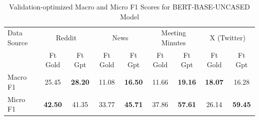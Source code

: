 \begin{table}[htbp]
\centering
\begin{tabular}{l *{8}{c}}
\toprule
Data Source & \multicolumn{2}{c}{Reddit} & \multicolumn{2}{c}{News} & \multicolumn{2}{c}{Meeting Minutes} & \multicolumn{2}{c}{X (Twitter)} \\
& Ft Gold & Ft Gpt & Ft Gold & Ft Gpt & Ft Gold & Ft Gpt & Ft Gold & Ft Gpt \\
\midrule
Macro F1 & 25.45 & \textbf{28.20} & 11.08 & \textbf{16.50} & 11.66 & \textbf{19.16} & \textbf{18.07} & 16.28 \\
Micro F1 & \textbf{42.50} & 41.35 & 33.77 & \textbf{45.71} & 37.86 & \textbf{57.61} & 26.14 & \textbf{59.45} \\
\bottomrule
\end{tabular}
\centering\caption{Validation-optimized Macro and Micro F1 Scores for BERT-BASE-UNCASED Model}
\label{tab:bert-base-uncased_macro_micro}
\end{table}